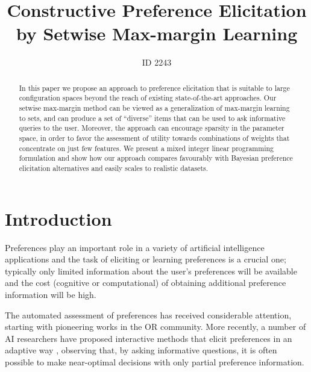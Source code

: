 \documentclass{article}
\title{Constructive Preference Elicitation by Setwise Max-margin Learning} %
\author{ID 2243}
\renewcommand\[{\begin{equation}}
\renewcommand\]{\end{equation}}
\begin{document}
\maketitle

\begin{abstract}
  In this paper we propose an approach to preference elicitation that
  is suitable to large configuration spaces beyond the reach of
  existing state-of-the-art approaches. Our setwise max-margin method
  can be viewed as a generalization of max-margin learning to sets,
  and can produce a set of ``diverse'' items that can be used to ask
  informative queries to the user.  Moreover, the approach can
  encourage sparsity in the parameter space, in order to favor the
  assessment of utility towards combinations of weights that
  concentrate on just few features.  We present a mixed integer linear
  programming formulation and show how our approach compares
  favourably with Bayesian preference elicitation alternatives and
  easily scales to realistic datasets.
\end{abstract}

\section{Introduction}

Preferences \cite{Peintner2008} play an important role in a variety of artificial
intelligence applications and the task of eliciting or learning preferences is a crucial one; 
typically only limited
information about the user's preferences will be available and the
cost (cognitive or computational) of obtaining additional preference information will be high.  

The automated assessment of preferences has received considerable attention,
starting with pioneering works \cite{White1984,JacquetLagreze95} in the OR community.
More recently, a number of AI researchers have proposed interactive methods that elicit
preferences in an adaptive way
\cite{chajewska2000,boutilier2002,Wang2003,boutilier2006,guo2010real,viappiani2010optimal},
observing that, by asking informative questions, it is often possible to make near-optimal decisions with only partial preference information.
\end{document}

